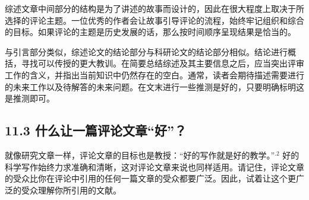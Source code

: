 综述文章中间部分的结构是为了讲述的故事而设计的，因此在很大程度上取决于所选择的评论主题。一位优秀的作者会让故事引导评论的流程，始终牢记组织和综合的目标。如果评论的主题是历史发展的话，那么按时间顺序呈现结果是恰当的。

与引言部分类似，综述论文的结论部分与科研论文的结论部分相似。结论进行概括，寻找可以传授的更大教训。在简要总结综述及其主要信息之后，应当突出评审工作的含义，并指出当前知识中仍然存在的空白。通常，读者会期待描述需要进行的未来工作以及待解答的未来问题。在文末进行一些推测是好的，只要明确标明这是推测即可。

\subsection*{11.3 什么让一篇评论文章“好”？}
就像研究文章一样，评论文章的目标也是教授：“好的写作就是好的教学。”${ }^{.2}$ 好的科学写作始终力求准确和清晰，这对评论文章来说也同样适用。请记住，评论文章的受众比你在评论中引用的任何一篇文章的受众都要广泛。因此，试着让这个更广泛的受众理解你所引用的文献。

